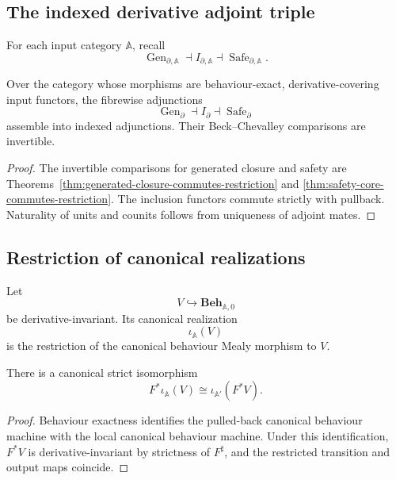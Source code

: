 \subsection{The indexed derivative adjoint triple}
\label{subsec:indexed-derivative-adjoint-triple}

For each input category \(\mathbb A\), recall
\[
    \operatorname{Gen}_{\partial,\mathbb A}
    \dashv
    I_{\partial,\mathbb A}
    \dashv
    \operatorname{Safe}_{\partial,\mathbb A}.
\]

\begin{corollary}
\label{cor:indexed-derivative-adjoint-triple}
Over the category whose morphisms are behaviour-exact,
derivative-covering input functors, the fibrewise adjunctions
\[
    \operatorname{Gen}_{\partial}
    \dashv
    I_{\partial}
    \dashv
    \operatorname{Safe}_{\partial}
\]
assemble into indexed adjunctions. Their Beck--Chevalley comparisons are
invertible.
\end{corollary}

\begin{proof}
The invertible comparisons for generated closure and safety are
Theorems~\ref{thm:generated-closure-commutes-restriction} and
\ref{thm:safety-core-commutes-restriction}. The inclusion functors commute
strictly with pullback. Naturality of units and counits follows from
uniqueness of adjoint mates.
\end{proof}

\subsection{Restriction of canonical realizations}
\label{subsec:restriction-canonical-realizations}

Let
\[
    V\hookrightarrow\mathbf{Beh}_{\mathbb A,0}
\]
be derivative-invariant. Its canonical realization
\[
    \iota_{\mathbb A}(V)
\]
is the restriction of the canonical behaviour Mealy morphism to \(V\).

\begin{proposition}
\label{prop:restriction-canonical-realizations}
There is a canonical strict isomorphism
\[
    F^\ast
    \iota_{\mathbb A}(V)
    \cong
    \iota_{\mathbb A'}
    (F^\ast V).
\]
\end{proposition}

\begin{proof}
Behaviour exactness identifies the pulled-back canonical behaviour machine
with the local canonical behaviour machine. Under this identification,
\(F^\ast V\) is derivative-invariant by strictness of \(F^\sharp\), and the
restricted transition and output maps coincide.
\end{proof}

